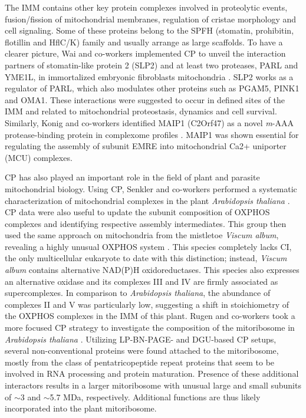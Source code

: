 The IMM contains other key protein complexes involved in proteolytic events, fusion/fission of mitochondrial membranes, regulation of cristae morphology and cell signaling. Some of these proteins belong to the SPFH (stomatin, prohibitin, flotillin and HflC/K) family and usually arrange as large scaffolds. To have a clearer picture, Wai and co-workers implemented CP to unveil the interaction partners of stomatin-like protein 2 (SLP2) and at least two proteases, PARL and YME1L, in immortalized embryonic fibroblasts mitochondria \cite{Wai_2016}. SLP2 works as a regulator of PARL, which also modulates other proteins such as PGAM5, PINK1 and OMA1. These interactions were suggested to occur in defined sites of the IMM and related to mitochondrial proteostasis, dynamics and cell survival. Similarly, Konig and co-workers identified MAIP1 (C2Orf47) as a novel \emph{m}-AAA protease-binding protein in complexome profiles \cite{Konig_2016}. MAIP1 was shown essential for regulating the assembly of subunit EMRE into mitochondrial Ca2+ uniporter (MCU) complexes.

CP has also played an important role in the field of plant and parasite mitochondrial biology. Using CP, Senkler and co-workers performed a systematic characterization of mitochondrial complexes in the plant \emph{Arabidopsis thaliana} \cite{Senkler_2017}. CP data were also useful to update the subunit composition of OXPHOS complexes and identifying respective assembly intermediates. This group then used the same approach on mitochondria from the mistletoe \emph{Viscum album}, revealing a highly unusual OXPHOS system \cite{Senkler_2018}. This species completely lacks CI, the only multicellular eukaryote to date with this distinction; instead, \emph{Viscum album} contains alternative NAD(P)H oxidoreductases. This species also expresses an alternative oxidase and its complexes III and IV are firmly associated as supercomplexes. In comparison to \emph{Arabidopsis thaliana}, the abundance of complexes II and V was particularly low, suggesting a shift in stoichiometry of the OXPHOS complexes in the IMM of this plant. Rugen and co-workers took a more focused CP strategy to investigate the composition of the mitoribosome in \emph{Arabidopsis thaliana} \cite{Rugen_2019}. Utilizing LP-BN-PAGE- and DGU-based CP setups, several non-conventional proteins were found attached to the mitoribosome, mostly from the class of pentatricopeptide repeat proteins that seem to be involved in RNA processing and protein maturation. Presence of these additional interactors results in a larger mitoribosome with unusual large and small subunits of $\sim$3 and $\sim$5.7 MDa, respectively. Additional functions are thus likely incorporated into the plant mitoribosome.

